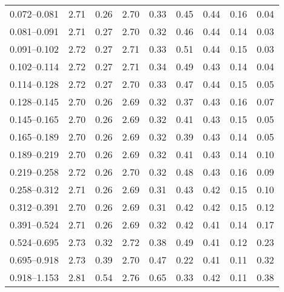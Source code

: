 \begin{table}
\begin{center}
\begin{tabular}{@{}l l l l l l l l l@{}}
            0.072--0.081    &  2.71   &  0.26   &  2.70         &  0.33      &  0.45    &  0.44  &  0.16       &  0.04  \\
            0.081--0.091    &  2.71   &  0.27   &  2.70         &  0.32      &  0.46    &  0.44  &  0.14       &  0.03  \\
            0.091--0.102    &  2.72   &  0.27   &  2.71         &  0.33      &  0.51    &  0.44  &  0.15       &  0.03  \\
            0.102--0.114    &  2.72   &  0.27   &  2.71         &  0.34      &  0.49    &  0.43  &  0.14       &  0.04  \\
            0.114--0.128    &  2.72   &  0.27   &  2.70         &  0.33      &  0.47    &  0.44  &  0.15       &  0.05  \\
            0.128--0.145    &  2.70   &  0.26   &  2.69         &  0.32      &  0.37    &  0.43  &  0.16       &  0.07  \\
            0.145--0.165    &  2.70   &  0.26   &  2.69         &  0.32      &  0.41    &  0.43  &  0.15       &  0.05  \\
            0.165--0.189    &  2.70   &  0.26   &  2.69         &  0.32      &  0.39    &  0.43  &  0.14       &  0.05  \\
            0.189--0.219    &  2.70   &  0.26   &  2.69         &  0.32      &  0.41    &  0.43  &  0.14       &  0.10  \\
            0.219--0.258    &  2.72   &  0.26   &  2.70         &  0.32      &  0.48    &  0.43  &  0.16       &  0.09  \\
            0.258--0.312    &  2.71   &  0.26   &  2.69         &  0.31      &  0.43    &  0.42  &  0.15       &  0.10  \\
            0.312--0.391    &  2.70   &  0.26   &  2.69         &  0.31      &  0.42    &  0.42  &  0.15       &  0.12  \\
            0.391--0.524    &  2.71   &  0.26   &  2.69         &  0.32      &  0.42    &  0.41  &  0.14       &  0.17  \\
            0.524--0.695    &  2.73   &  0.32   &  2.72         &  0.38      &  0.49    &  0.41  &  0.12       &  0.23  \\
            0.695--0.918    &  2.73   &  0.39   &  2.70         &  0.47      &  0.22    &  0.41  &  0.11       &  0.32  \\
            0.918--1.153    &  2.81   &  0.54   &  2.76         &  0.65      &  0.33    &  0.42  &  0.11       &  0.38  \\

\end{tabular}
\end{center}
\end{table}
